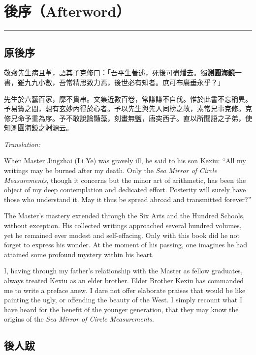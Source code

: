 \documentclass[11pt,a4paper]{article}
\newcommand{\longline}{\noindent\rule{\textwidth}{0.4pt}}
\begin{document}
\section{後序（Afterword）}
\label{sec:afterword}

\longline

\subsection*{原後序}

敬齋先生病且革，語其子克修曰：「吾平生著述，死後可盡燔去。獨\textbf{測圓海鏡}一書，雖九九小數，吾常精思致力焉，後世必有知者。庶可布廣垂永乎？」

先生於六藝百家，靡不貫串。文集近數百卷，常謙謙不自伐。惟於此書不忘稱異。予易簀之間，想有玄妙內得於心者。予以先生與先人同榜之故，素常兄事克修。克修兄命予重為序。予不敢說論豔藻，刻畫無鹽，唐突西子。直以所聞語之子弟，使知測圓海鏡之淵源云。

\vspace{0.5cm}
\textit{Translation:}

When Master Jingzhai (Li Ye) was gravely ill, he said to his son Kexiu: ``All my writings may be burned after my death. Only the \textit{Sea Mirror of Circle Measurements}, though it concerns but the minor art of arithmetic, has been the object of my deep contemplation and dedicated effort. Posterity will surely have those who understand it. May it thus be spread abroad and transmitted forever?''

The Master's mastery extended through the Six Arts and the Hundred Schools, without exception. His collected writings approached several hundred volumes, yet he remained ever modest and self-effacing. Only with this book did he not forget to express his wonder. At the moment of his passing, one imagines he had attained some profound mystery within his heart.

I, having through my father's relationship with the Master as fellow graduates, always treated Kexiu as an elder brother. Elder Brother Kexiu has commanded me to write a preface anew. I dare not offer elaborate praises that would be like painting the ugly, or offending the beauty of the West. I simply recount what I have heard for the benefit of the younger generation, that they may know the origins of the \textit{Sea Mirror of Circle Measurements}.

\vspace{1cm}
\subsection*{後人跋}
\end{document}
